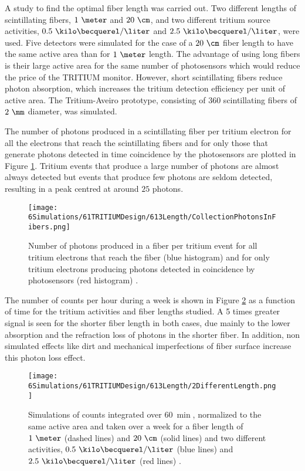 A study to find the optimal fiber length was carried out. Two different lengths of scintillating fibers, $1~\meter$ and $20~\cm$, and two different tritium source activities, $0.5~\kilo\becquerel/\liter$ and $2.5~\kilo\becquerel/\liter$, were used. Five detectors were simulated for the case of a $20~\cm$ fiber length to have the same active area than for $1~\meter$ length. The advantage of using long fibers is their large active area for the same number of photosensors which would reduce the price of the TRITIUM monitor. However, short scintillating fibers reduce photon absorption, which increases the tritium detection efficiency per unit of active area. The Tritium-Aveiro prototype, consisting of $360$ scintillating fibers of $2~\mm$ diameter, was simulated. 

The number of photons produced in a scintillating fiber per tritium electron for all the electrons that reach the scintillating fibers and for only those that generate photons detected in time coincidence by the photosensors are plotted in Figure \ref{fig:PhotonsFibersYesNoPhotosensors}. Tritium events that produce a large number of photons are almost always detected but events that produce few photons are seldom detected, resulting in a peak centred at around $25$ photons.  

\begin{figure}[h]
\centering
\texttt{[image: 6Simulations/61TRITIUMDesign/613Length/CollectionPhotonsInFibers.png]}
\caption{Number of photons produced in a fiber per tritium event for all tritium electrons that reach the fiber (blue histogram) and for only tritium electrons producing photons detected in coincidence by photosensors (red histogram) \cite{SimulationPaperCarlos}.\label{fig:PhotonsFibersYesNoPhotosensors}}
\end{figure}


The number of counts per hour during a week is shown in Figure \ref{fig:CountsOver60minDifferentLength} as a function of time for the tritium activities and fiber lengths studied. A 5 times greater signal is seen for the shorter fiber length in both cases, due mainly to the lower absorption and the refraction loss of photons in the shorter fiber. In addition, non simulated effects like dirt and mechanical imperfections of fiber surface increase this photon loss effect.

\begin{figure}[h]
\centering
\texttt{[image: 6Simulations/61TRITIUMDesign/613Length/2DifferentLength.png]}
\caption{Simulations of counts integrated over $60~\min$, normalized to the same active area and taken over a week for a fiber length of $1~\meter$ (dashed lines) and $20~\cm$ (solid lines) and two different activities, $0.5~\kilo\becquerel/\liter$ (blue lines) and $2.5~\kilo\becquerel/\liter$ (red lines) \cite{SimulationPaperCarlos}. \label{fig:CountsOver60minDifferentLength}}
\end{figure}

